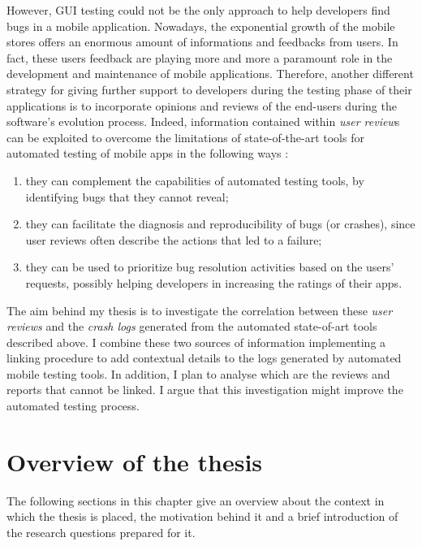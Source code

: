 However, GUI testing could not be the only approach to help developers find bugs in a mobile application. Nowadays, the exponential growth of the mobile stores offers an enormous amount of informations and feedbacks from users. In fact, these users feedback are playing more and more a paramount role in the development and maintenance of mobile applications. Therefore, another different strategy for giving further support to developers during the testing phase of their applications is to incorporate opinions and reviews of the end-users during the software's evolution process. \newline
Indeed, information contained within \textit{user review}s can be exploited to overcome the limitations of state-of-the-art tools for automated testing of mobile apps in the following ways \cite{cristal}: 
\begin{enumerate}
\item they can complement the capabilities of automated testing tools, by identifying bugs that they cannot reveal; 
\item they can facilitate the diagnosis and reproducibility of bugs (or crashes), since user reviews often describe the actions that led to a failure; 
\item they can be used to prioritize bug resolution activities based on the users' requests, possibly helping developers in increasing the ratings of their apps.
\end{enumerate} 


The aim behind my thesis is to investigate the correlation between these \textit{user reviews} and the \textit{crash logs} generated from the automated state-of-art tools described above. I combine these two sources of information implementing a linking procedure to add contextual details to the logs generated by automated mobile testing tools. In addition, I plan to analyse which are the reviews and reports that cannot be linked. I argue that this investigation might improve the automated testing process. \newpage


\section{Overview of the thesis}
The following sections in this chapter give an overview about the context in which the thesis is placed, the motivation behind it and a brief introduction of the research questions prepared for it. 

